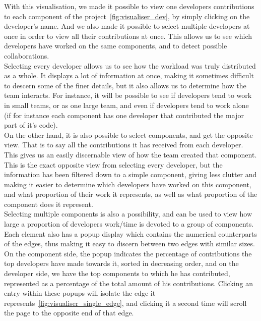 With this visualisation, we made it possible to view one developers contributions to each component of the project~\ref{fig:visualiser_dev}, by simply clicking on the developer's name. And we also made it possible to select multiple developers at once in order to view all their contributions at once. This allows us to see which developers have worked on the same components, and to detect possible collaborations.\\
Selecting every developer allows us to see how the workload was truly distributed as a whole. It displays a lot of information at once, making it sometimes difficult to descern some of the finer details, but it also allows us to determine how the team interacts.
For instance, it will be possible to see if developers tend to work in small teams, or as one large team, and even if developers tend to work alone (if for instance each component has one developer that contributed the major part of it's code).\\[0.3cm]

On the other hand, it is also possible to select components, and get the opposite view. That is to say all the contributions it has received from each developer. This gives us an easily discernable view of how the team created that component.  This is the exact opposite view from selecting every developer, but the information has been filtered down to a simple component, giving less clutter and making it easier to determine which developers have worked on this component, and what proportion of their work it represents, as well as what proportion of the component does it represent.\\
Selecting multiple components is also a possibility, and can be used to view how large a proportion of developers work/time is devoted to a group of components.\\[0.3cm]

Each element also has a popup display which contains the numerical counterparts of the edges, thus making it easy to discern between two edges with similar sizes.
On the component side, the popup indicates the percentage of contributions the top developers have made towards it, sorted in decreasing order, and on the developer side, we have the top components to which he has contributed, represented as a percentage of the total amount of his contributions.
Clicking an entry within these popups will isolate the edge it represents~\ref{fig:visualiser_single_edge}, and clicking it a second time will scroll the page to the opposite end of that edge.